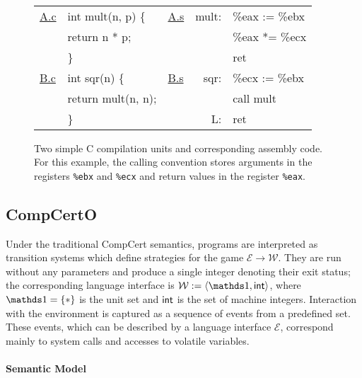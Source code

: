 \begin{figure} %
  \figsize
  \tt
  \begin{tabular}{ll lr@{\ }l}
    \hline
    \underline{A.c} & int mult(n, p) \{ &
    \underline{A.s} & mult: & \%eax := \%ebx \\
                    & \quad return n * p; &
                    & & \%eax *= \%ecx \\
                    & \} &
                    & & ret \\
    \hline
    \underline{B.c} & int sqr(n) \{ &
    \underline{B.s} & sqr: & \%ecx := \%ebx \\
                    & \quad return mult(n, n); &
                    & & call mult \\
                    & \} &
                    & L: & ret \\
    \hline
  \end{tabular}
  \caption{Two simple C compilation units and corresponding assembly code.
    For this example,
    the calling convention stores arguments in
    the registers
    \texttt{\%ebx} and \texttt{\%ecx}
    and return values in
    the register
    \texttt{\%eax}.}
  \label{fig:abc}
\end{figure}



\subsection{CompCertO} \label{sec:mainideas:compcerto} %

Under the traditional CompCert semantics,
programs are interpreted as transition systems
which define strategies for the game
$\mathcal{E} \rightarrow \mathcal{W}$.
They are run without any parameters
and produce a single integer denoting their exit status;
the corresponding language interface is
$\mathcal{W} := \langle \unitset, \kw{int} \rangle$,
where $\unitset = \{ * \}$ is the unit set
and $ \mathsf{int} $ is the set of machine integers.
Interaction with the environment
is captured as a sequence of events from a predefined set.
These events,
which can be described by a language interface $\mathcal{E}$,
correspond mainly to system calls and accesses to volatile variables.

\paragraph{Semantic Model} %

